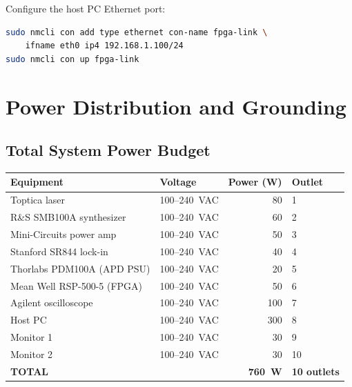 \documentclass[11pt,a4paper,openany]{book}
\begin{document}
\noindent
Configure the host PC Ethernet port:

\begin{lstlisting}[language=bash,numbers=none]
sudo nmcli con add type ethernet con-name fpga-link \
    ifname eth0 ip4 192.168.1.100/24
sudo nmcli con up fpga-link
\end{lstlisting}



\chapter{Power Distribution and Grounding}\label{ch:power}

\section{Total System Power Budget}

\begin{center}
\begin{tabular}{llrl}
\toprule
\textbf{Equipment} & \textbf{Voltage} & \textbf{Power (W)} & \textbf{Outlet} \\
\midrule
Toptica laser & 100--240~VAC & 80 & 1 \\
R\&S SMB100A synthesizer & 100--240~VAC & 60 & 2 \\
Mini-Circuits power amp & 100--240~VAC & 50 & 3 \\
Stanford SR844 lock-in & 100--240~VAC & 40 & 4 \\
Thorlabs PDM100A (APD PSU) & 100--240~VAC & 20 & 5 \\
Mean Well RSP-500-5 (FPGA) & 100--240~VAC & 50 & 6 \\
Agilent oscilloscope & 100--240~VAC & 100 & 7 \\
Host PC & 100--240~VAC & 300 & 8 \\
Monitor 1 & 100--240~VAC & 30 & 9 \\
Monitor 2 & 100--240~VAC & 30 & 10 \\
\midrule
\textbf{TOTAL} & & \textbf{760~W} & \textbf{10 outlets} \\
\bottomrule
\end{tabular}
\end{center}
\end{document}
